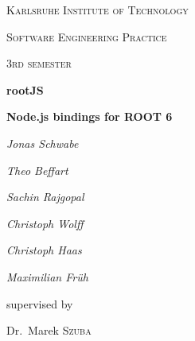 \begin{titlepage}
	\centering
	{\scshape\LARGE Karlsruhe Institute of Technology \par}
	\vspace{1cm}
	{\scshape\Large Software Engineering Practice\par}
	{\scshape\Large 3rd semester\par}
	\vspace{1.5cm}
	{\Huge\bfseries rootJS\par}
	\vspace{0.25cm}
	{\Large\bfseries Node.js bindings for ROOT 6\par}
	\vspace{2cm}
	{\Large\itshape Jonas Schwabe\par}
	{\Large\itshape Theo Beffart\par}
	{\Large\itshape Sachin Rajgopal\par}
	{\Large\itshape Christoph Wolff\par}
	{\Large\itshape Christoph Haas\par}
	
	{\Large\itshape Maximilian Fr\"uh\par}
	\vfill
	supervised by\par
	Dr.~Marek \textsc{Szuba}
	
	\vfill
	
	{\large \date{30.11.2015}\par}
\end{titlepage}
